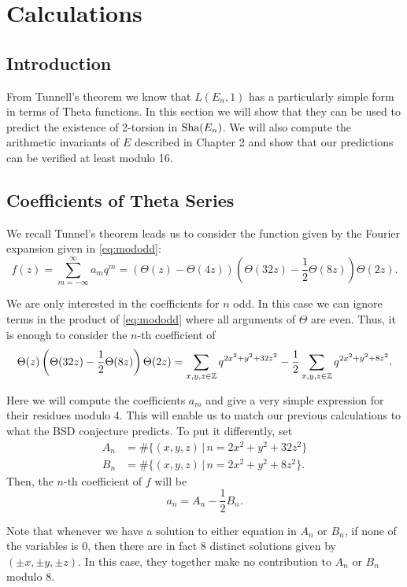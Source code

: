 \documentclass[12pt, a4paper]{report}
\begin{document}
\newpage

\chapter{Calculations}

\section{Introduction}

From Tunnell's theorem we know that $L(E_n,1)$ has a particularly simple
form in terms of Theta functions. In this section we will show that they can be
used to predict the existence of 2-torsion in $\text{\normalfont Sha}(E_n)$. We will also compute
the arithmetic invariants of $E$ described in Chapter 2 and show that our
predictions can be verified at least modulo 16.


\section{Coefficients of Theta Series}
We recall Tunnel's theorem leads us to consider the function given by the
Fourier expansion given in \autoref{eq:mododd}:
\[
  f(z) = \sum\limits_{m=-\infty}^\infty a_m q^m
  = (\Theta(z) - \Theta(4z)) \left(\Theta(32z)-\frac{1}{2} \Theta(8z)\right) \Theta(2z).
\]


We are only interested in the coefficients for $n$ odd. In this case we can
ignore terms in the product of \autoref{eq:mododd} where all arguments of
$\Theta$ are even. Thus, it is enough to
consider the $n$-th coefficient of
\[
  \Theta(z) \left( \Theta(32z) - \frac{1}{2} \Theta(8z) \right)\Theta(2z) =
  \sum\limits_{x, y, z \in {\mathbb Z}} q^{2x^2+y^2+32z^2} - \frac{1}{2}
  \sum\limits_{x,y,z \in {\mathbb Z}} q^{2x^2+y^2+8z^2}.
\]

Here we will compute the coefficients $a_m$ and give a very simple expression for
their residues modulo 4. This will enable us to match our previous calculations
to what the BSD conjecture predicts.
To put it differently, set
\begin{equation*}
  \begin{split}
    A_n &= \#\{(x,y,z) \,|\, n = 2x^2 + y^2 + 32z^2\} \\
    B_n &= \#\{(x,y,z) \,|\, n = 2x^2 + y^2 + 8z^2\}.
  \end{split}
\end{equation*}
Then, the $n$-th coefficient of $f$ will be
\[a_n = A_n - \frac{1}{2}B_n.\]

Note that whenever we have a solution to either equation in $A_n$ or $B_n$,
if none of the variables is 0, then there are in fact 8 distinct
solutions given by $(\pm x, \pm y, \pm z)$.
In this case, they together make no contribution to $A_n$ or $B_n$ modulo 8.
\end{document}
